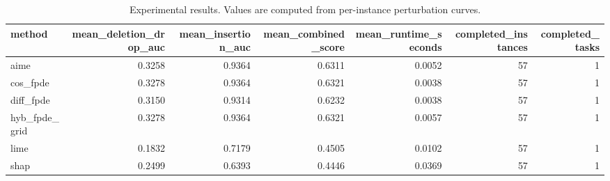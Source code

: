 \begin{table}[t]
\caption{Experimental results. Values are computed from per-instance perturbation curves.}
\label{tab:main_results_computed}
\centering
\begin{tabular}{lrrrrrr}
\toprule
method & mean\_deletion\_drop\_auc & mean\_insertion\_auc & mean\_combined\_score & mean\_runtime\_seconds & completed\_instances & completed\_tasks \\
\midrule
aime & 0.3258 & 0.9364 & 0.6311 & 0.0052 & 57 & 1 \\
cos\_fpde & 0.3278 & 0.9364 & 0.6321 & 0.0038 & 57 & 1 \\
diff\_fpde & 0.3150 & 0.9314 & 0.6232 & 0.0038 & 57 & 1 \\
hyb\_fpde\_grid & 0.3278 & 0.9364 & 0.6321 & 0.0057 & 57 & 1 \\
lime & 0.1832 & 0.7179 & 0.4505 & 0.0102 & 57 & 1 \\
shap & 0.2499 & 0.6393 & 0.4446 & 0.0369 & 57 & 1 \\
\bottomrule
\end{tabular}

\end{table}
